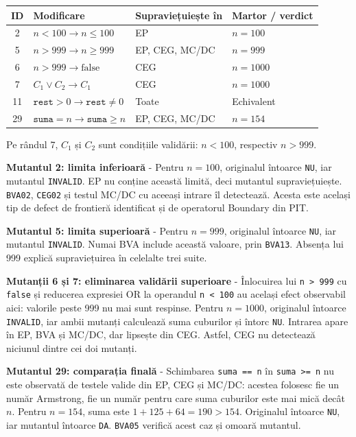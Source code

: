 \documentclass[11pt,a4paper]{article}
\begin{document}
\begin{center}
\begingroup\small
\begin{tabular}{@{}clll@{}}
\toprule
ID & Modificare & Supraviețuiește în & Martor / verdict \\
\midrule
2 & $n<100\to n\leq100$ & EP & $n=100$ \\
5 & $n>999\to n\geq999$ & EP, CEG, MC/DC & $n=999$ \\
6 & $n>999\to\mathrm{false}$ & CEG & $n=1000$ \\
7 & $C_1\lor C_2\to C_1$ & CEG & $n=1000$ \\
11 & $\texttt{rest}>0\to\texttt{rest}\ne0$ & Toate & Echivalent \\
29 & $\texttt{suma}=n\to\texttt{suma}\geq n$ & EP, CEG, MC/DC & $n=154$ \\
\bottomrule
\end{tabular}
\endgroup
\end{center}
Pe rândul 7, $C_1$ și $C_2$ sunt condițiile validării:
$n<100$, respectiv $n>999$.

\textbf{Mutantul 2: limita inferioară}
- Pentru $n=100$, originalul întoarce \texttt{NU}, iar mutantul
\texttt{INVALID}. EP nu conține această limită, deci mutantul supraviețuiește.
\texttt{BVA02}, \texttt{CEG02} și testul MC/DC cu aceeași intrare
îl detectează. Acesta este același tip de defect de frontieră identificat
și de operatorul Boundary din PIT.

\textbf{Mutantul 5: limita superioară}
- Pentru $n=999$, originalul întoarce \texttt{NU}, iar mutantul
\texttt{INVALID}. Numai BVA include această valoare, prin \texttt{BVA13}.
Absența lui 999 explică supraviețuirea în celelalte trei suite.

\textbf{Mutanții 6 și 7: eliminarea validării superioare}
- Înlocuirea lui \texttt{n > 999} cu \texttt{false} și reducerea expresiei
OR la operandul \texttt{n < 100} au același efect observabil aici:
valorile peste 999 nu mai sunt respinse.
Pentru $n=1000$, originalul întoarce \texttt{INVALID}, iar ambii mutanți
calculează suma cuburilor și întorc \texttt{NU}.
Intrarea apare în EP, BVA și MC/DC, dar lipsește din CEG.
Astfel, CEG nu detectează niciunul dintre cei doi mutanți.

\textbf{Mutantul 29: comparația finală}
- Schimbarea \texttt{suma == n} în \texttt{suma >= n} nu este observată
de testele valide din EP, CEG și MC/DC: acestea folosesc fie un număr
Armstrong, fie un număr pentru care suma cuburilor este mai mică decât $n$.
Pentru $n=154$, suma este $1+125+64=190>154$.
Originalul întoarce \texttt{NU}, iar mutantul întoarce \texttt{DA}.
\texttt{BVA05} verifică acest caz și omoară mutantul.
\end{document}

